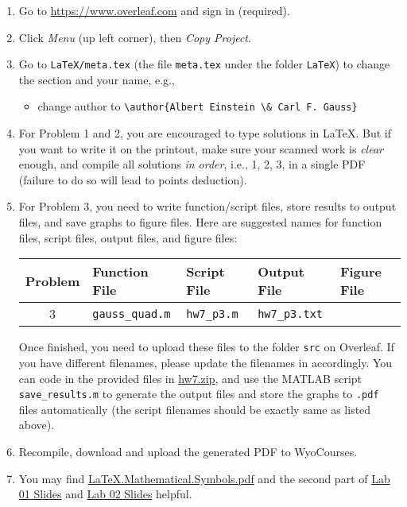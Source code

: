 \begin{enumerate}[label={\arabic*.}]
  \item Go to \url{https://www.overleaf.com} and sign in (required).
  \item Click \emph{Menu} (up left corner), then \emph{Copy Project}.
  \item Go to \verb|LaTeX/meta.tex| (the file \verb|meta.tex| under the folder \verb|LaTeX|) to change the section and your name, e.g.,
    \begin{itemize}
      \item change author to \verb|\author{Albert Einstein \& Carl F. Gauss}|
    \end{itemize}
  \item For Problem 1 and 2, you are encouraged to type solutions in \LaTeX{}. But if you want to write it on the printout, make sure your scanned work is \emph{clear} enough, and compile all solutions \emph{in order}, i.e., 1, 2, 3, in a single PDF (failure to do so will lead to points deduction).
  \item For Problem 3, you need to write function/script files, store results to output files, and save graphs to figure files. Here are suggested names for function files, script files, output files, and figure files:
    \begin{table}[!hbtp]
      \centering
      \begin{tabular}{cllll}
        \toprule
        Problem & Function File       & Script File     & Output File      & Figure File   \\
        \midrule
        3       & \verb|gauss_quad.m| & \verb|hw7_p3.m| & \verb|hw7_p3.txt| &               \\
        \bottomrule
      \end{tabular}
    \end{table}

    Once finished, you need to upload these files to the folder \verb|src| on Overleaf. If you have different filenames, please update the filenames in \verb|| accordingly. You can code in the provided files in \href{https://libaoj.in/courses/2020s/MATH3340/Homework/7/hw7.zip}{hw7.zip}, and use the MATLAB script \verb|save_results.m| to generate the output files and store the graphs to \verb|.pdf| files automatically (the script filenames should be exactly same as listed above).
  \item Recompile, download and upload the generated PDF to WyoCourses.
  \item You may find \href{https://libaoj.in/files/LaTeX.Mathematical.Symbols.pdf}{\LaTeX{}.Mathematical.Symbols.pdf} and the second part of \href{https://libaoj.in/courses/2020s/MATH3341/slides/Math.3341.Lab.01.Slides.pdf}{Lab 01 Slides} and \href{https://libaoj.in/courses/2020s/MATH3341/slides/Math.3341.Lab.02.Slides.pdf}{Lab 02 Slides} helpful.
\end{enumerate}

